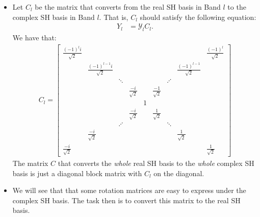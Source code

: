 \documentclass[10pt]{article}
\begin{document}
\begin{itemize}
        \item Let $C_l$ be the matrix that converts from the real SH basis in Band $l$ to the complex SH basis in Band $l$.  That is, $C_l$ should satisfy the following equation:
        \begin{align*}
            Y_l &= \mathcal{Y}_l C_l.
        \end{align*}
        We have that:
        \begin{align*}
            C_l = \begin{bmatrix}
                \frac{(-1)^l i}{\sqrt{2}} & & & & & & & & \frac{(-1)^l}{\sqrt{2}} \\
                & \frac{(-1)^{l-1}i}{\sqrt{2}} & & & & & & \frac{(-1)^{l-1}}{\sqrt{2}} & \\
                & & \ddots & & & & \iddots & & \\
                & & & \frac{-i}{\sqrt{2}} & & \frac{-1}{\sqrt{2}} & & & \\
                & & & & 1 & & & & \\
                & & & \frac{-i}{\sqrt{2}} & & \frac{1}{\sqrt{2}} & & & \\
                & & \iddots & & & & \ddots & & \\
                & \frac{-i}{\sqrt{2}} & & & & & & \frac{1}{\sqrt{2}} & \\
                \frac{-i}{\sqrt{2}} & & & & & & & & \frac{1}{\sqrt{2}}
            \end{bmatrix}
        \end{align*}
        The matrix $C$ that converts the \emph{whole} real SH basis to the \emph{whole} complex SH basis is just a diagonal block matrix with $C_l$ on the diagonal. 

        \item We will see that that some rotation matrices are easy to express under the complex SH basis.  The task then is to convert this matrix to the real SH basis.


\end{itemize}
\end{document}
